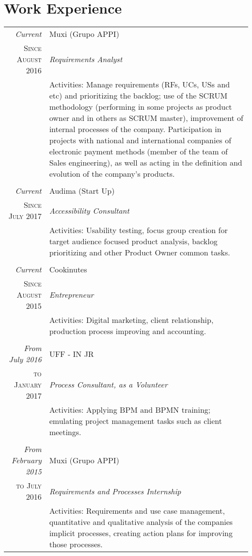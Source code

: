 \documentclass[a4paper,10pt]{article}
\begin{document}
\section{Work Experience}
\begin{tabular}{r|p{10.8cm}}
 \emph{Current} & Muxi (Grupo APPI) \\
 \textsc{Since August 2016}&\emph{Requirements Analyst}\\
 &\footnotesize{Activities: Manage requirements (RFs, UCs, USs and etc) and prioritizing the backlog; use of the SCRUM methodology (performing in some projects as product owner and in others as SCRUM master), improvement of internal processes of the company. Participation in projects with national and international companies of electronic payment methods (member of the team of Sales engineering), as well as acting in the definition and evolution of the company's products.}\\
  
 & \\
 
 \emph{Current} & Audima (Start Up) \\
 \textsc{Since July 2017}&\emph{Accessibility Consultant}\\
 &\footnotesize{Activities: Usability testing, focus group creation for target audience focused product analysis, backlog prioritizing and other Product Owner common tasks.}\\
 
 & \\
 
 \emph{Current} & Cookinutes \\
 \textsc{Since August 2015}&\emph{Entrepreneur}\\
 &\footnotesize{Activities: Digital marketing, client relationship, production process improving and accounting.}\\
 
 & \\
 
 \emph{From July 2016} & UFF - IN JR \\
 \textsc{to January 2017}&\emph{Process Consultant, as a Volunteer}\\
 &\footnotesize{Activities: Applying BPM and BPMN training; emulating project management tasks such as client meetings.}\\
 
 & \\
 
 \emph{From February 2015} & Muxi (Grupo APPI) \\
 \textsc{to July 2016}&\emph{Requirements and Processes Internship}\\
 &\footnotesize{Activities: Requirements and use case management, quantitative and qualitative analysis of the companies implicit processes, creating action plans for improving those processes.}\\
 

\end{tabular}
\end{document}
